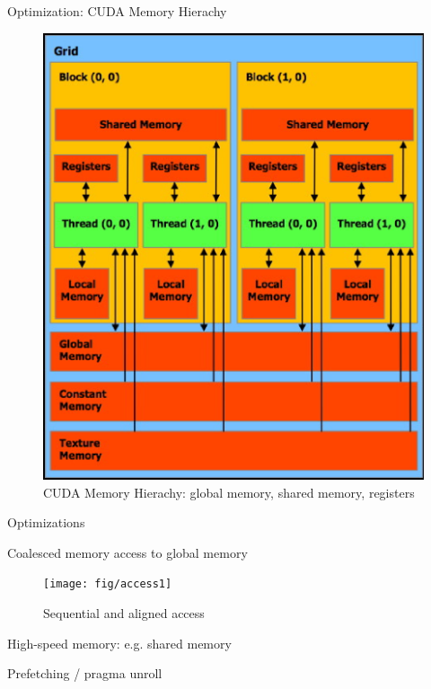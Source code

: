 \documentclass[
nopagebreaks,
style=klope,
fleqn]{powerdot}
\begin{document}
\begin{slide}{Optimization: CUDA Memory Hierachy}
  \begin{figure}[!h]
  \centering
  \includegraphics[height=0.6\textheight]{fig/cuda_memory}
  \caption{CUDA Memory Hierachy: global memory, shared memory, registers}
  \label{fig:cuda_memory}
  \end{figure}

\end{slide}

\begin{slide}{Optimizations}
  \begin{compactitem}
  \item{Coalesced memory access to global memory}
    \begin{figure}[!h]
    \centering
    \texttt{[image: fig/access1]}
    \caption{Sequential and aligned access}
    \label{fig:access1}
    \end{figure}
  \item{High-speed memory: e.g. shared memory}
  \item{Prefetching / pragma unroll}
  \end{compactitem}
\end{slide}
\end{document}
